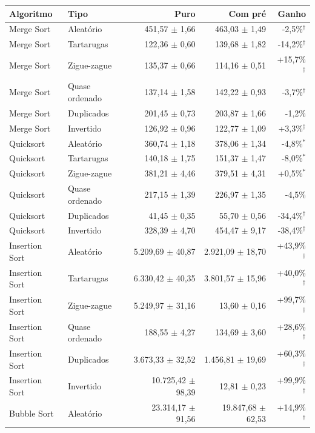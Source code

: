 \footnotesize
\begin{tabular}{llrrr}
\hline
\textbf{Algoritmo} & \textbf{Tipo} & \textbf{Puro} & \textbf{Com pré} & \textbf{Ganho} \\
\hline
Merge Sort & Aleatório & 451,57 $\pm$ 1,66 & 463,03 $\pm$ 1,49 & -2,5\%$^{\dagger}$ \\
Merge Sort & Tartarugas & 122,36 $\pm$ 0,60 & 139,68 $\pm$ 1,82 & -14,2\%$^{\dagger}$ \\
Merge Sort & Zigue-zague & 135,37 $\pm$ 0,66 & 114,16 $\pm$ 0,51 & +15,7\%$^{\dagger}$ \\
Merge Sort & Quase ordenado & 137,14 $\pm$ 1,58 & 142,22 $\pm$ 0,93 & -3,7\%$^{\dagger}$ \\
Merge Sort & Duplicados & 201,45 $\pm$ 0,73 & 203,87 $\pm$ 1,66 & -1,2\% \\
Merge Sort & Invertido & 126,92 $\pm$ 0,96 & 122,77 $\pm$ 1,09 & +3,3\%$^{\dagger}$ \\
Quicksort & Aleatório & 360,74 $\pm$ 1,18 & 378,06 $\pm$ 1,34 & -4,8\%$^{*}$ \\
Quicksort & Tartarugas & 140,18 $\pm$ 1,75 & 151,37 $\pm$ 1,47 & -8,0\%$^{*}$ \\
Quicksort & Zigue-zague & 381,21 $\pm$ 4,46 & 379,51 $\pm$ 4,31 & +0,5\%$^{*}$ \\
Quicksort & Quase ordenado & 217,15 $\pm$ 1,39 & 226,97 $\pm$ 1,35 & -4,5\% \\
Quicksort & Duplicados & 41,45 $\pm$ 0,35 & 55,70 $\pm$ 0,56 & -34,4\%$^{\dagger}$ \\
Quicksort & Invertido & 328,39 $\pm$ 4,70 & 454,47 $\pm$ 9,17 & -38,4\%$^{\dagger}$ \\
Insertion Sort & Aleatório & 5.209,69 $\pm$ 40,87 & 2.921,09 $\pm$ 18,70 & +43,9\%$^{\dagger}$ \\
Insertion Sort & Tartarugas & 6.330,42 $\pm$ 40,35 & 3.801,57 $\pm$ 15,96 & +40,0\%$^{\dagger}$ \\
Insertion Sort & Zigue-zague & 5.249,97 $\pm$ 31,16 & 13,60 $\pm$ 0,16 & +99,7\%$^{\dagger}$ \\
Insertion Sort & Quase ordenado & 188,55 $\pm$ 4,27 & 134,69 $\pm$ 3,60 & +28,6\%$^{\dagger}$ \\
Insertion Sort & Duplicados & 3.673,33 $\pm$ 32,52 & 1.456,81 $\pm$ 19,69 & +60,3\%$^{\dagger}$ \\
Insertion Sort & Invertido & 10.725,42 $\pm$ 98,39 & 12,81 $\pm$ 0,23 & +99,9\%$^{\dagger}$ \\
Bubble Sort & Aleatório & 23.314,17 $\pm$ 91,56 & 19.847,68 $\pm$ 62,53 & +14,9\%$^{\dagger}$ \\

\end{tabular}
